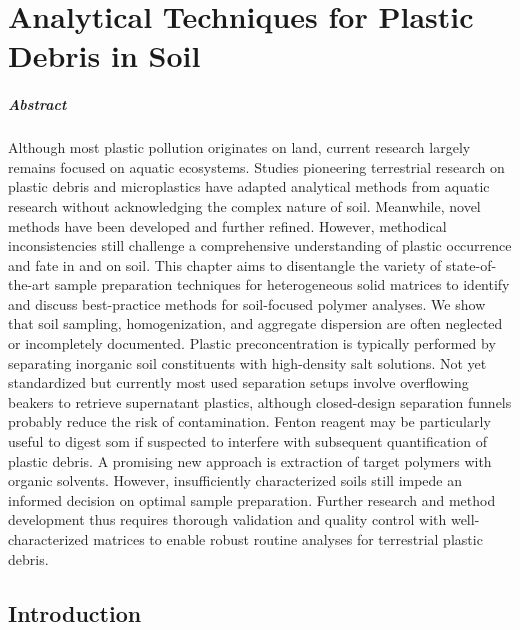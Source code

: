 
\chapter{Analytical Techniques for Plastic Debris in Soil}
\label{ch:analytical-techniques}

\paragraph{Abstract} Although most plastic pollution originates on land, current research largely remains focused on aquatic ecosystems. Studies pioneering terrestrial research on plastic debris and microplastics have adapted analytical methods from aquatic research without acknowledging the complex nature of soil. Meanwhile, novel methods have been developed and further refined. However, methodical inconsistencies still challenge a comprehensive understanding of plastic occurrence and fate in and on soil. This chapter aims to disentangle the variety of state-of-the-art sample preparation techniques for heterogeneous solid matrices to identify and discuss best-practice methods for soil-focused polymer analyses. We show that soil sampling, homogenization, and aggregate dispersion are often neglected or incompletely documented. Plastic preconcentration is typically performed by separating inorganic soil constituents with high-density salt solutions. Not yet standardized but currently most used separation setups involve overflowing beakers to retrieve supernatant plastics, although closed-design separation funnels probably reduce the risk of contamination. Fenton reagent may be particularly useful to digest \ac{som} if suspected to interfere with subsequent quantification of plastic debris. A promising new approach is extraction of target polymers with organic solvents. However, insufficiently characterized soils still impede an informed decision on optimal sample preparation. Further research and method development thus requires thorough validation and quality control with well-characterized matrices to enable robust routine analyses for terrestrial plastic debris.

\section{Introduction}
\label{sec:analytical-techniques:intro}

